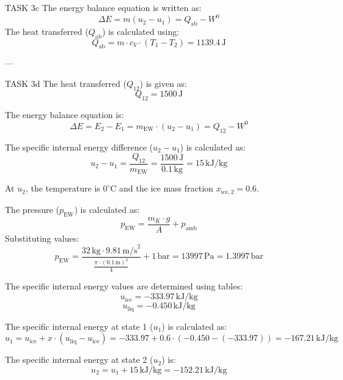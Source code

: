 TASK 3c  
The energy balance equation is written as:  
\[
\Delta E = m(u_2 - u_1) = Q_{\text{ab}} - W^0
\]  
The heat transferred (\( Q_{\text{ab}} \)) is calculated using:  
\[
Q_{\text{ab}} = m \cdot c_V \cdot (T_1 - T_2) = 1139.4 \, \text{J}
\]  

---

TASK 3d  
The heat transferred (\( Q_{12} \)) is given as:  
\[
Q_{12} = 1500 \, \text{J}
\]  

The energy balance equation is:  
\[
\Delta E = E_2 - E_1 = m_{\text{EW}} \cdot (u_2 - u_1) = Q_{12} - W^0
\]  

The specific internal energy difference (\( u_2 - u_1 \)) is calculated as:  
\[
u_2 - u_1 = \frac{Q_{12}}{m_{\text{EW}}} = \frac{1500 \, \text{J}}{0.1 \, \text{kg}} = 15 \, \text{kJ/kg}
\]  

At \( u_2 \), the temperature is \( 0^\circ\text{C} \) and the ice mass fraction \( x_{\text{ice},2} = 0.6 \).  

The pressure (\( p_{\text{EW}} \)) is calculated as:  
\[
p_{\text{EW}} = \frac{m_K \cdot g}{A} + p_{\text{amb}}
\]  
Substituting values:  
\[
p_{\text{EW}} = \frac{32 \, \text{kg} \cdot 9.81 \, \text{m/s}^2}{\frac{\pi \cdot (0.1 \, \text{m})^2}{4}} + 1 \, \text{bar} = 13997 \, \text{Pa} = 1.3997 \, \text{bar}
\]  

The specific internal energy values are determined using tables:  
\[
u_{\text{ice}} = -333.97 \, \text{kJ/kg}
\]  
\[
u_{\text{liq}} = -0.450 \, \text{kJ/kg}
\]  

The specific internal energy at state 1 (\( u_1 \)) is calculated as:  
\[
u_1 = u_{\text{ice}} + x \cdot (u_{\text{liq}} - u_{\text{ice}}) = -333.97 + 0.6 \cdot (-0.450 - (-333.97)) = -167.21 \, \text{kJ/kg}
\]  

The specific internal energy at state 2 (\( u_2 \)) is:  
\[
u_2 = u_1 + 15 \, \text{kJ/kg} = -152.21 \, \text{kJ/kg}
\]  